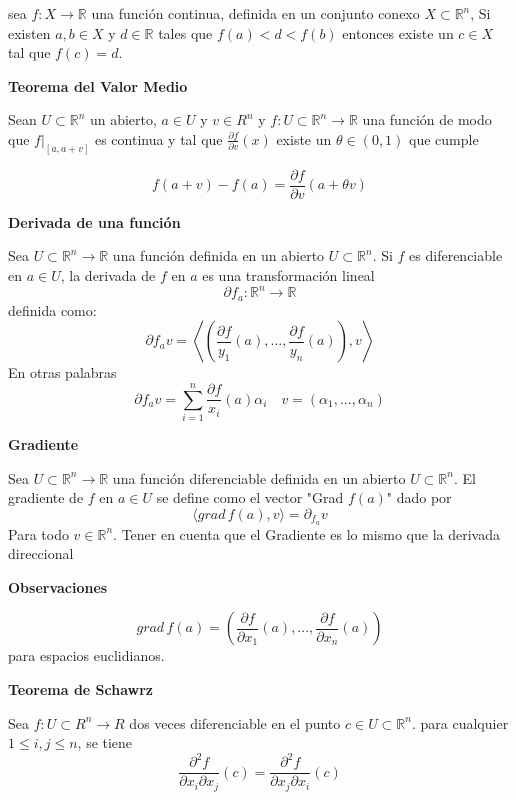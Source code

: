\documentclass{article}
\newcommand{\R}{\mathbb R}
\begin{document}
sea $f:X\rightarrow\R$ una función continua, definida en un conjunto conexo $X\subset\R^n$, Si existen $a,b\in X$ y $d\in\R$ tales que $f(a)<d<f(b)$ entonces existe un $c\in X$ tal que $f(c)=d$.

\noindent\textbf{Teorema del Valor Medio}


Sean $U\subset \mathbb R^n$ un abierto, $a\in U$ y $v\in R^n$ y $f:U\subset\mathbb R^n\rightarrow \mathbb R$ una función de modo que $f|_{[a,a+v]}$ es continua y tal que $\frac{\partial f}{\partial v}(x)$ existe un $\theta\in (0,1)$ que cumple

\[f(a+v)-f(a)=\frac{\partial f}{\partial v}(a+\theta v)\]

\noindent\textbf{Derivada de una función}

Sea $U\subset\R^n\rightarrow\R$ una función definida en un abierto $U\subset\R^n$. Si $f$ es diferenciable en $a\in U$, la derivada de $f$ en $a$ es una transformación lineal
\[\partial f_a:\R^n\rightarrow\R\]
definida como: 
\[\partial f_a v=\left\langle\left(\frac{\partial f}{y_1}(a),...,\frac{\partial f}{y_n}(a)\right),v\right\rangle\]
En otras palabras
\[\partial f_a v=\sum_{i=1}^n \frac{\partial f}{x_i}(a)\alpha_i\quad v=(\alpha_1,...,\alpha_n)\]

\noindent\textbf{Gradiente}

Sea $U\subset\R^n\rightarrow\R$ una función diferenciable definida en un abierto $U\subset\R^n$. El gradiente de $f$ en $a\in U$ se define como el vector "Grad $f(a)$" dado por
\[\langle grad\,f(a),v\rangle=\partial_{f_a} v\]
Para todo $v\in \R^n$. 
Tener en cuenta que el Gradiente es lo mismo que la derivada direccional

\textbf{Observaciones}

\[ grad\,f(a)=\left(\frac{\partial f}{\partial x_1}(a),...,\frac{\partial f}{\partial x_n}(a)\right)\]
para espacios euclidianos.

\noindent\textbf{Teorema de Schawrz}

Sea $f:U\subset R^n\rightarrow R$ dos veces diferenciable en el punto $c\in U\subset\R^n$. para cualquier $1\leq i,j\leq n$, se tiene
\[\frac{\partial^2 f}{\partial x_i\partial x_j}(c)=\frac{\partial^2 f}{\partial x_j\partial x_i}(c)\]
\end{document}
